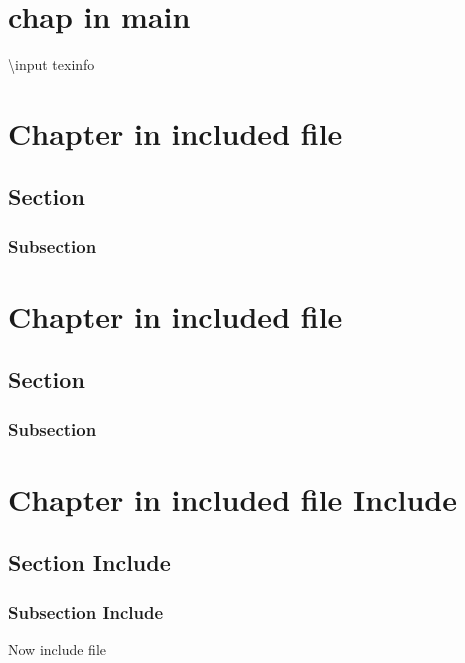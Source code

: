\documentclass{book}
\newcommand{\Texinfothechapterheading}{}
\newcommand{\Texinfoheadingchaptername}{\chaptername}
\newcommand{\Texinfotheinclude}{}%
\newcommand{\Texinfochapter}[1]{\chapter{#1}
\renewcommand{\Texinfothechapterheading}{\Texinfoheadingchaptername{} \thechapter{} }%
}%
\renewcommand{\_}{\Texinfounderscore\discretionary{}{}{}}
\begin{document}
\tableofcontents\newpage
\label{anchor:Top}%
\Texinfochapter{{chap in main}}
\label{anchor:in-main}%

\renewcommand{\Texinfotheinclude}{section\_file.texi}%
\textbackslash{}input texinfo 

\Texinfochapter{{Chapter in included file}}
\label{anchor:Chapter-in-included-file}%


\section{{Section}}
\label{anchor:Section}%


\subsection{{Subsection}}
\label{anchor:Subsection}%

\renewcommand{\Texinfotheinclude}{}%

\renewcommand{\Texinfotheinclude}{section\_file\_no\_node.texi}%


\Texinfochapter{{Chapter in included file}}

\section{{Section}}

\subsection{{Subsection}}

\renewcommand{\Texinfotheinclude}{}%

\renewcommand{\Texinfotheinclude}{section\_file\_no\_node\_include.texi}%


\Texinfochapter{{Chapter in included file Include}}
\label{anchor:Chapter-in-included-file-Include}%

\section{{Section Include}}
\label{anchor:Section-Include}%

\subsection{{Subsection Include}}
\label{anchor:Subsection-Include}%


Now include file
\renewcommand{\Texinfotheinclude}{section\_file\_no\_node.texi}%
\end{document}

